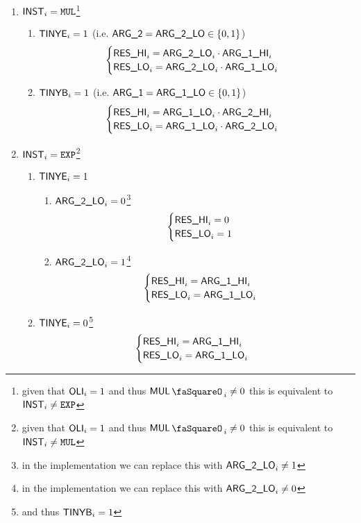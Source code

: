 \begin{enumerate}
	\item \If $\textsf{INST}_{i} = \texttt{MUL}$\footnote{given that $\textsf{OLI}_{i} = 1$ and thus $\mulStamp_{i} \neq 0$ this is equivalent to $\textsf{INST}_{i} \neq \texttt{EXP}$} \Then
	\begin{enumerate}
		\item \If $\textsf{TINYE}_{i} = 1$ (i.e. $\textsf{ARG}\textsf{\_2} = \textsf{ARG}\textsf{\_2}\textsf{\_LO} \in \{ 0, 1 \}$) \Then
		\[
		\begin{cases}
			\textsf{RES}\textsf{\_HI}_{i} = \textsf{ARG}\textsf{\_2}\textsf{\_LO}_{i} \cdot \textsf{ARG}\textsf{\_1}\textsf{\_HI}_{i} \\
			\textsf{RES}\textsf{\_LO}_{i} = \textsf{ARG}\textsf{\_2}\textsf{\_LO}_{i} \cdot \textsf{ARG}\textsf{\_1}\textsf{\_LO}_{i} \\
		\end{cases}
		\]
		\item \If $\textsf{TINYB}_{i} = 1$ (i.e. $\textsf{ARG}\textsf{\_1} = \textsf{ARG}\textsf{\_1}\textsf{\_LO} \in \{ 0, 1 \}$) \Then
		\[
		\begin{cases}
			\textsf{RES}\textsf{\_HI}_{i} = \textsf{ARG}\textsf{\_1}\textsf{\_LO}_{i} \cdot \textsf{ARG}\textsf{\_2}\textsf{\_HI}_{i} \\
			\textsf{RES}\textsf{\_LO}_{i} = \textsf{ARG}\textsf{\_1}\textsf{\_LO}_{i} \cdot \textsf{ARG}\textsf{\_2}\textsf{\_LO}_{i} \\
		\end{cases}
		\]
	\end{enumerate}
	\item \If $\textsf{INST}_{i} = \texttt{EXP}$\footnote{given that $\textsf{OLI}_{i} = 1$ and thus $\mulStamp_{i} \neq 0$ this is equivalent to $\textsf{INST}_{i} \neq \texttt{MUL}$} \Then
	\begin{enumerate}
		\item \If $\textsf{TINYE}_{i} = 1$ \Then
		\begin{enumerate}
			\item \If $\textsf{ARG}\textsf{\_2}\textsf{\_LO}_{i} = 0$\footnote{in the implementation we can replace this with \If $\textsf{ARG}\textsf{\_2}\textsf{\_LO}_{i} \neq 1$} \Then 
			\[
			\begin{cases}
				\textsf{RES}\textsf{\_HI}_{i} = 0 \\
				\textsf{RES}\textsf{\_LO}_{i} = 1 \\
			\end{cases}
			\]
			\item \If $\textsf{ARG}\textsf{\_2}\textsf{\_LO}_{i} = 1$\footnote{in the implementation we can replace this with \If $\textsf{ARG}\textsf{\_2}\textsf{\_LO}_{i} \neq 0$} \Then 
			\[
			\begin{cases}
				\textsf{RES}\textsf{\_HI}_{i} = \textsf{ARG}\textsf{\_1}\textsf{\_HI}_{i} \\
				\textsf{RES}\textsf{\_LO}_{i} = \textsf{ARG}\textsf{\_1}\textsf{\_LO}_{i} \\
			\end{cases}
			\]
		\end{enumerate}
		\item \If $\textsf{TINYE}_{i} = 0$\footnote{and thus $\textsf{TINYB}_{i} = 1$} \Then
		\[
		\begin{cases}
			\textsf{RES}\textsf{\_HI}_{i} = \textsf{ARG}\textsf{\_1}\textsf{\_HI}_{i} \\
			\textsf{RES}\textsf{\_LO}_{i} = \textsf{ARG}\textsf{\_1}\textsf{\_LO}_{i} \\
		\end{cases}
		\]
	\end{enumerate}
\end{enumerate}
